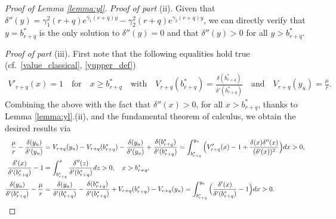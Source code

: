\documentclass[10pt,a4paper]{amsart}
\begin{document}
\begin{proof}[Proof of Lemma \ref{lemma:yl}]
\vspace{1mm}
{\it Proof of part} (ii).
Given that 
$\delta''(y) = \gamma_1^2(r+q)e^{\gamma_1(r+q)y} - \gamma_2^2(r+q)e^{\gamma_2(r+q)y}$, we can directly verify that $y = b^*_{r+q}$ is the only solution to $\delta''(y)=0$ and that $\delta''(y)>0$ for all $y > b^*_{r+q}$. 

\vspace{1mm}
{\it Proof of part} (iii).
First note that the following equalities hold true (cf.~\eqref{value_classical}, \eqref{yupper_def}) 
\begin{align*} 
V'_{r+q}(x)=1 \quad \text{for} \quad x \geq b^*_{r+q} 
\quad \text{with} \quad 
V_{r+q}(b^*_{r+q}) = \tfrac{\delta(b^*_{r+q})}{\delta'(b^*_{r+q})} 
\quad \text{and} \quad 
V_{r+q}(y_u)=\frac{\mu}{r}. 
\end{align*}
Combining the above with 
the fact that $\delta''(x)>0$, for all $x > b^*_{r+q}$, thanks to Lemma \ref{lemma:yl}.(ii), and the fundamental theorem of calculus, we obtain the desired results via 
\begin{align*}
\frac{\mu}{r} - \frac{\delta(y_u)}{\delta'(y_u)} 
&= V_{r+q}(y_u) - V_{r+q}(b^*_{r+q}) - \frac{\delta(y_u)}{\delta'(y_u)} + \frac{\delta(b^*_{r+q})}{\delta'(b^*_{r+q})} 
= \int_{b^*_{r+q}}^{y_u} \Big( V_{r+q}'(x) - 1 + \frac{\delta(x)\delta''(x)}{(\delta'(x))^2} \Big) dx > 0, \notag\\
\frac{\delta'(x)}{\delta'(b^*_{r+q})} - 1 &= \int_{b^*_{r+q}}^{x} \frac{\delta''(z)}{\delta'(b^*_{r+q})} dz > 0, \quad x>b^*_{r+q}, \\
\frac{\delta(y_u)}{\delta'(b^*_{r+q})} - \frac{\mu}{r} 
&= \frac{\delta(y_u)}{\delta'(b^*_{r+q})} - \frac{\delta(b^*_{r+q})}{\delta'(b^*_{r+q})} + V_{r+q}(b^*_{r+q}) - V_{r+q}(y_u) = \int_{b^*_{r+q}}^{y_u} \Big(\frac{\delta'(x)}{\delta'(b^*_{r+q})} - 1 \Big) dx > 0.
\end{align*}


\end{proof}
\end{document}
